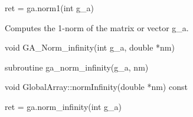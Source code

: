 \documentclass[10pt]{article}
\begin{document}
\begin{pyapi}
\begin{pycode}
ret = ga.norm1(int g_a)
\end{pycode}
\begin{funcargs}
\end{funcargs}
\end{pyapi}

\gcoll

\begin{desc}
Computes the 1-norm of the matrix or vector g_a.
\end{desc}



\begin{capi}
\begin{ccode}
void GA_Norm_infinity(int g_a, double *nm)
\end{ccode}
\begin{funcargs}
\end{funcargs}
\end{capi}

\begin{fapi}
\begin{fcode}
subroutine ga_norm_infinity(g_a, nm)
\end{fcode}
\begin{funcargs}
\end{funcargs}
\end{fapi}

\begin{cxxapi}
\begin{cxxcode}
void GlobalArray::normInfinity(double *nm) const
\end{cxxcode}
\begin{funcargs}
\end{funcargs}
\end{cxxapi}

\begin{pyapi}
\begin{pycode}
ret = ga.norm_infinity(int g_a)
\end{pycode}
\begin{funcargs}
\end{funcargs}
\end{pyapi}
\end{document}
